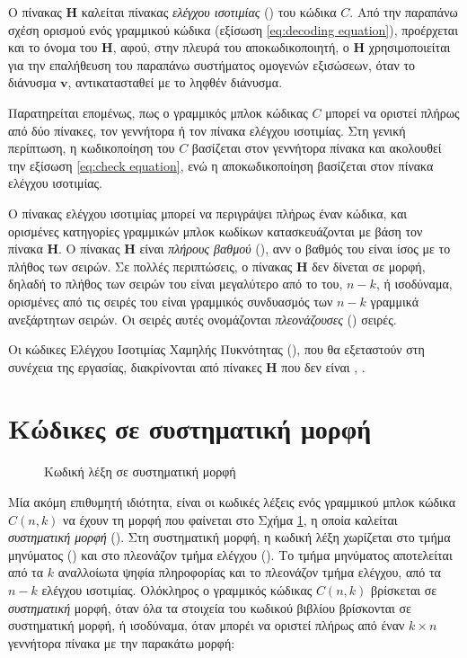 Ο πίνακας $\mathbf{H}$ καλείται πίνακας \textit{ελέγχου ισοτιμίας} () του κώδικα $C$. Από την παραπάνω σχέση ορισμού ενός γραμμικού κώδικα (εξίσωση \ref{eq:decoding equation}), προέρχεται και το όνομα του $\mathbf{H}$, αφού, στην πλευρά του αποκωδικοποιητή, ο $\mathbf{H}$ χρησιμοποιείται για την επαλήθευση του παραπάνω συστήματος ομογενών εξισώσεων, όταν το διάνυσμα $\mathbf{v}$, αντικατασταθεί με το ληφθέν διάνυσμα.

Παρατηρείται επομένως, πως ο γραμμικός μπλοκ κώδικας $C$ μπορεί να οριστεί πλήρως από δύο πίνακες, τον γεννήτορα ή τον πίνακα ελέγχου ισοτιμίας. Στη γενική περίπτωση, η κωδικοποίηση του $C$ βασίζεται στον γεννήτορα πίνακα και ακολουθεί την εξίσωση \ref{eq:check equation}, ενώ η αποκωδικοποίηση βασίζεται στον πίνακα ελέγχου ισοτιμίας.

Ο πίνακας ελέγχου ισοτιμίας μπορεί να περιγράψει πλήρως έναν κώδικα, και ορισμένες κατηγορίες γραμμικών μπλοκ κωδίκων κατασκευάζονται με βάση τον πίνακα $\mathbf{H}$. Ο πίνακας $\mathbf{H}$ είναι \textit{πλήρους βαθμού} (), ανν ο βαθμός του είναι ίσος με το πλήθος των σειρών. Σε πολλές περιπτώσεις, ο πίνακας $\mathbf{H}$ δεν δίνεται σε  μορφή, δηλαδή το πλήθος των σειρών του είναι μεγαλύτερο από το  του, $n-k$, ή ισοδύναμα, ορισμένες από τις σειρές του είναι γραμμικός συνδυασμός των $n-k$ γραμμικά ανεξάρτητων σειρών. Οι σειρές αυτές ονομάζονται \textit{πλεονάζουσες} () σειρές. 

Οι κώδικες Ελέγχου Ισοτιμίας Χαμηλής Πυκνότητας (), που θα εξεταστούν στη συνέχεια της εργασίας, διακρίνονται από πίνακες $\mathbf{H}$ που δεν είναι  \cite{cover2012elements}, \cite{ryan2009channel}.

\section{Κώδικες σε συστηματική μορφή}

\begin{figure}[h]
\caption{Κωδική λέξη σε συστηματική μορφή}
\label{fig:systematic form}
\end{figure}

Μία ακόμη επιθυμητή ιδιότητα, είναι οι κωδικές λέξεις ενός γραμμικού μπλοκ κώδικα $C(n,k)$ να έχουν τη μορφή που φαίνεται στο Σχήμα \ref{fig:systematic form}, η οποία καλείται \textit{συστηματική μορφή} (). Στη συστηματική μορφή, η κωδική λέξη χωρίζεται στο τμήμα μηνύματος () και στο πλεονάζον τμήμα ελέγχου (). Το τμήμα μηνύματος αποτελείται από τα $k$ αναλλοίωτα ψηφία πληροφορίας και το πλεονάζον τμήμα ελέγχου, από τα $n-k$  ελέγχου ισοτιμίας. Ολόκληρος ο γραμμικός  κώδικας $C(n,k)$ βρίσκεται σε \textit{συστηματική} μορφή, όταν όλα τα στοιχεία του κωδικού βιβλίου βρίσκονται σε συστηματική μορφή, ή ισοδύναμα, όταν μπορέι να οριστεί πλήρως από έναν $k \times n$ γεννήτορα πίνακα με την παρακάτω μορφή:

